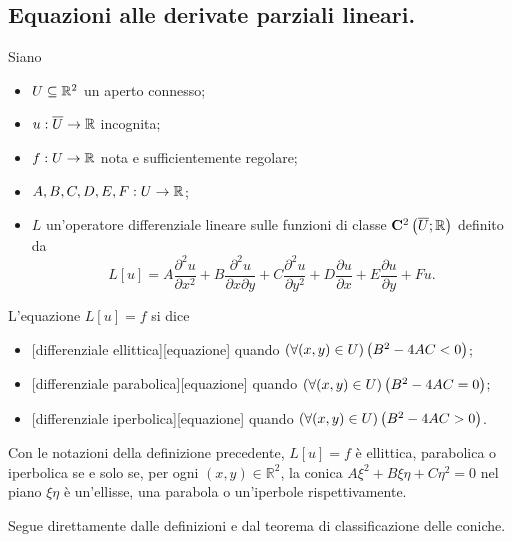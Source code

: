 \subsection{Equazioni alle derivate parziali lineari.}
\label{EquazioniDifferenziali_EquazioniAlleDerivateParzialiLineari}
\begin{Definition}
  Siano
  \begin{itemize}
    \item $U \subseteq \mathbb{R}^2$ un aperto connesso;
    \item $u: \overline{U} \rightarrow \mathbb{R}$ incognita;
    \item $f: U \rightarrow \mathbb{R}$ nota e
      sufficientemente regolare;
    \item $A, B, C, D, E, F: U \rightarrow \mathbb{R}$;
    \item $L$ un'operatore differenziale lineare sulle funzioni di classe
      $\CClass{2}[\Closure{\OpenConnected}][\mathbb{R}]$ definito da
      \[
        L[u]
        = A \frac{\partial^2 u}{\partial x^2}
        + B \frac{\partial^2 u}{\partial x \partial y}
        + C \frac{\partial^2 u}{\partial y^2}
        + D \frac{\partial u}{\partial x}
        + E \frac{\partial u}{\partial y}
        + Fu.
      \]
  \end{itemize}
  L'equazione $L[u] = f$ si dice
  \begin{itemize}
    \item {}[differenziale ellittica][equazione]
      quando $\left ( \forall (x,y) \in U \right ) \left ( B^2 - 4AC < 0 \right )$;
    \item {}[differenziale parabolica][equazione]
      quando $\left ( \forall (x,y) \in U \right ) \left ( B^2 - 4AC = 0 \right )$;
    \item {}[differenziale iperbolica][equazione]
      quando $\left ( \forall (x,y) \in U \right ) \left ( B^2 - 4AC > 0 \right )$.
  \end{itemize}
\end{Definition}
\begin{Theorem}
  Con le notazioni della definizione precedente, $L[u] = f$ \`e
  ellittica, parabolica o iperbolica se e solo se, per ogni
  $(x,y) \in \mathbb{R}^2$, la conica $A\xi^2 + B\xi\eta + C\eta^2 = 0$
  nel piano $\xi\eta$ \`e un'ellisse, una parabola o un'iperbole
  rispettivamente.
\end{Theorem}
\Proof Segue direttamente dalle definizioni e dal teorema di classificazione
delle coniche. \EndProof

